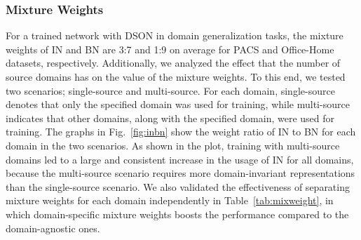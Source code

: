 \documentclass[runningheads]{llncs}
\begin{document}
\subsubsection{Mixture Weights} 
For a trained network with DSON in domain generalization tasks, the mixture weights of IN and BN are 3:7 and 1:9 on average for PACS and Office-Home datasets, respectively.
Additionally, we analyzed the effect that the number of source domains has on the value of the mixture weights.
To this end, we tested two scenarios; single-source and multi-source.
For each domain, single-source denotes that only the specified domain was used for training, while multi-source indicates that other domains, along with the specified domain, were used for training.
The graphs in Fig.~\ref{fig:inbn} show the weight ratio of IN to BN for each domain in the two scenarios.
As shown in the plot, training with multi-source domains led to a large and consistent increase in the usage of IN for all domains, because the multi-source scenario requires more domain-invariant representations than the single-source scenario.
We also validated the effectiveness of separating mixture weights for each domain independently in Table~\ref{tab:mixweight}, in which domain-specific mixture weights boosts the performance compared to the domain-agnostic ones.
\end{document}
